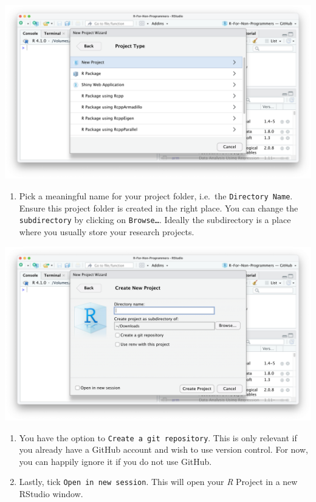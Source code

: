 \documentclass[
  letterpaper,
]{krantz}
\providecommand{\tightlist}{%
  \setlength{\itemsep}{0pt}\setlength{\parskip}{0pt}}\usepackage{longtable,booktabs,array}
\begin{document}
\includegraphics{images/chapter_06_img/00_r_project/02_r_project_new_project.png}

\begin{enumerate}
\def\labelenumi{\arabic{enumi}.}
\setcounter{enumi}{3}
\tightlist
\item
  Pick a meaningful name for your project folder, i.e.~the
  \texttt{Directory\ Name}. Ensure this project folder is created in the
  right place. You can change the \texttt{subdirectory} by clicking on
  \texttt{Browse…}. Ideally the subdirectory is a place where you
  usually store your research projects.
\end{enumerate}

\includegraphics{images/chapter_06_img/00_r_project/03_r_project_specs.png}

\begin{enumerate}
\def\labelenumi{\arabic{enumi}.}
\setcounter{enumi}{4}
\item
  You have the option to \texttt{Create\ a\ git\ repository}. This is
  only relevant if you already have a GitHub account and wish to use
  version control. For now, you can happily ignore it if you do not use
  GitHub.
\item
  Lastly, tick \texttt{Open\ in\ new\ session}. This will open your
  \emph{R} Project in a new RStudio window.
\end{enumerate}
\end{document}
